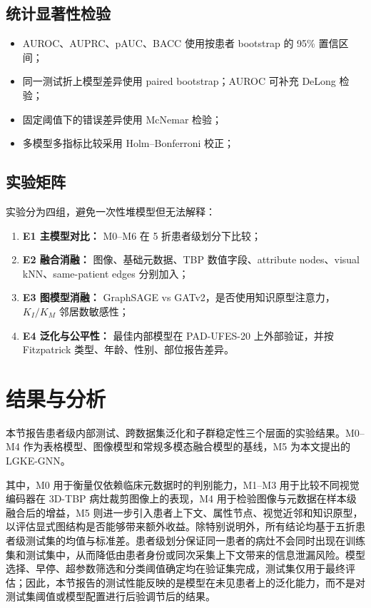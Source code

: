 \documentclass[UTF8,a4paper,10pt,twocolumn,fontset=fandol]{ctexart}
\newcommand{\pad}{PAD-UFES-20}
\newcommand{\modelname}{LGKE-GNN}
\begin{document}
\subsection{统计显著性检验}
\begin{itemize}
    \item AUROC、AUPRC、pAUC、BACC 使用按患者 bootstrap 的 95\% 置信区间；
    \item 同一测试折上模型差异使用 paired bootstrap；AUROC 可补充 DeLong 检验；
    \item 固定阈值下的错误差异使用 McNemar 检验；
    \item 多模型多指标比较采用 Holm--Bonferroni 校正；
\end{itemize}

\subsection{实验矩阵}
实验分为四组，避免一次性堆模型但无法解释：
\begin{enumerate}
    \item \textbf{E1 主模型对比：} M0--M6 在 5 折患者级划分下比较；
    \item \textbf{E2 融合消融：} 图像、基础元数据、TBP 数值字段、attribute nodes、visual kNN、same-patient edges 分别加入；
    \item \textbf{E3 图模型消融：} GraphSAGE vs GATv2，是否使用知识原型注意力，$K_I/K_M$ 邻居数敏感性；
    \item \textbf{E4 泛化与公平性：} 最佳内部模型在 \pad{} 上外部验证，并按 Fitzpatrick 类型、年龄、性别、部位报告差异。
\end{enumerate}



\section{结果与分析}
本节报告患者级内部测试、跨数据集泛化和子群稳定性三个层面的实验结果。M0--M4 作为表格模型、图像模型和常规多模态融合模型的基线，M5 为本文提出的 \modelname{}。

其中，M0 用于衡量仅依赖临床元数据时的判别能力，M1--M3 用于比较不同视觉编码器在 3D-TBP 病灶裁剪图像上的表现，M4 用于检验图像与元数据在样本级融合后的增益，M5 则进一步引入患者上下文、属性节点、视觉近邻和知识原型，以评估显式图结构是否能够带来额外收益。除特别说明外，所有结论均基于五折患者级测试集的均值与标准差。患者级划分保证同一患者的病灶不会同时出现在训练集和测试集中，从而降低由患者身份或同次采集上下文带来的信息泄漏风险。模型选择、早停、超参数筛选和分类阈值确定均在验证集完成，测试集仅用于最终评估；因此，本节报告的测试性能反映的是模型在未见患者上的泛化能力，而不是对测试集阈值或模型配置进行后验调节后的结果。
\end{document}
